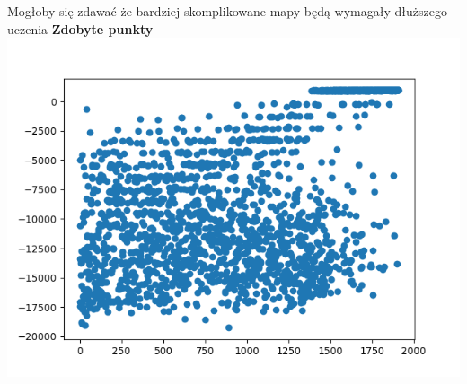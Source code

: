 \documentclass[a4paper,12pt]{article}
\begin{document}
Mogłoby się zdawać że bardziej skomplikowane mapy będą wymagały dłuższego uczenia \newline \newline
\textbf{\Large{Zdobyte punkty}} \newline
\includegraphics[scale=0.9]{testy/wykres6.png}
\newline \newline
\end{document}
